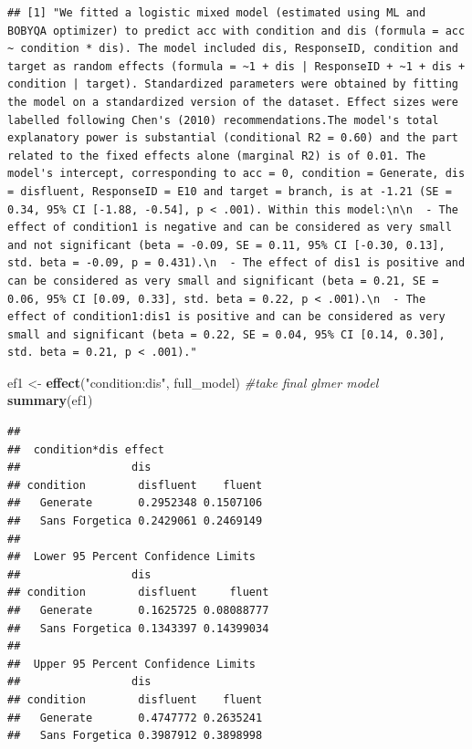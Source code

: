 \documentclass[pdf]{apa6}
\newenvironment{Shaded}{\begin{snugshade}}{\end{snugshade}}
\newcommand{\CommentTok}[1]{\textcolor[rgb]{0.56,0.35,0.01}{\textit{#1}}}
\newcommand{\KeywordTok}[1]{\textcolor[rgb]{0.13,0.29,0.53}{\textbf{#1}}}
\newcommand{\NormalTok}[1]{#1}
\newcommand{\StringTok}[1]{\textcolor[rgb]{0.31,0.60,0.02}{#1}}
\begin{document}
\begin{verbatim}
## [1] "We fitted a logistic mixed model (estimated using ML and BOBYQA optimizer) to predict acc with condition and dis (formula = acc ~ condition * dis). The model included dis, ResponseID, condition and target as random effects (formula = ~1 + dis | ResponseID + ~1 + dis + condition | target). Standardized parameters were obtained by fitting the model on a standardized version of the dataset. Effect sizes were labelled following Chen's (2010) recommendations.The model's total explanatory power is substantial (conditional R2 = 0.60) and the part related to the fixed effects alone (marginal R2) is of 0.01. The model's intercept, corresponding to acc = 0, condition = Generate, dis = disfluent, ResponseID = E10 and target = branch, is at -1.21 (SE = 0.34, 95% CI [-1.88, -0.54], p < .001). Within this model:\n\n  - The effect of condition1 is negative and can be considered as very small and not significant (beta = -0.09, SE = 0.11, 95% CI [-0.30, 0.13], std. beta = -0.09, p = 0.431).\n  - The effect of dis1 is positive and can be considered as very small and significant (beta = 0.21, SE = 0.06, 95% CI [0.09, 0.33], std. beta = 0.22, p < .001).\n  - The effect of condition1:dis1 is positive and can be considered as very small and significant (beta = 0.22, SE = 0.04, 95% CI [0.14, 0.30], std. beta = 0.21, p < .001)."
\end{verbatim}

\begin{Shaded}
\begin{Highlighting}[]
\NormalTok{ef1 <-}\StringTok{ }\KeywordTok{effect}\NormalTok{(}\StringTok{"condition:dis"}\NormalTok{, full_model) }\CommentTok{#take final glmer model }
\KeywordTok{summary}\NormalTok{(ef1)}
\end{Highlighting}
\end{Shaded}

\begin{verbatim}
## 
##  condition*dis effect
##                 dis
## condition        disfluent    fluent
##   Generate       0.2952348 0.1507106
##   Sans Forgetica 0.2429061 0.2469149
## 
##  Lower 95 Percent Confidence Limits
##                 dis
## condition        disfluent     fluent
##   Generate       0.1625725 0.08088777
##   Sans Forgetica 0.1343397 0.14399034
## 
##  Upper 95 Percent Confidence Limits
##                 dis
## condition        disfluent    fluent
##   Generate       0.4747772 0.2635241
##   Sans Forgetica 0.3987912 0.3898998
\end{verbatim}
\end{document}
